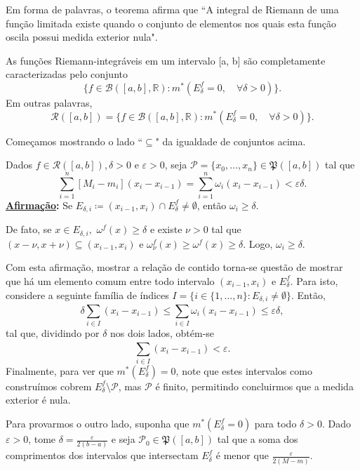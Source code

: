 \documentclass[../analysis_notes.tex]{subfiles}
\begin{document}
Em forma de palavras, o teorema afirma que ``A integral de Riemann de uma função limitada existe quando o conjunto de elementos nos quais esta função oscila possui medida exterior nula".
\begin{theorem*}
	As funções Riemann-integráveis em um intervalo [a, b] são completamente caracterizadas pelo conjunto
	\[
		\{f\in \mathcal{B}([a, b], \mathbb{R}): m^{*}(E_{\delta }^{f}=0,\quad \forall \delta >0)\}.
	\]
	Em outras palavras,
	\[
		\mathcal{R}([a, b])=\{f\in \mathcal{B}([a, b], \mathbb{R}): m^{*}(E_{\delta }^{f}=0,\quad \forall \delta >0)\}.
	\]
\end{theorem*}
\begin{proof*}
	Começamos mostrando o lado ``\(\subseteq \)" da igualdade de conjuntos acima.

	Dados \(f\in \mathcal{R}([a, b]), \delta > 0\) e \(\varepsilon >0\), seja \(\mathcal{P}=\{x_{0}, \dotsc , x_{n}\}\in \mathfrak{P}([a, b])\) tal que
	\[
		\sum\limits_{i=1}^{n}[M_{i}-m_{i}](x_{i}-x_{i-1})=\sum\limits_{i=1}^{n}\omega_{i}(x_{i}-x_{i-1})<\varepsilon\delta.
	\]
	\textbf{\underline{Afirmação}:} Se \(E_{\delta, i}\coloneqq (x_{i-1}, x_{i})\cap E_{\delta}^{f}\neq\emptyset\), então \(\omega_{i}\geq \delta \).

	De fato, se \(x\in E_{\delta , i},\) \(\omega^{f}(x)\geq \delta \) e existe \(\nu >0\) tal que \((x-\nu, x+\nu )\subseteq (x_{i-1}, x_{i})\) e \(\omega_{\nu }^{f}(x)\geq \omega^{f}(x)\geq \delta \). Logo, \(\omega_{i}\geq \delta \).

	Com esta afirmação, mostrar a relação de contido torna-se questão de mostrar que há um elemento comum entre todo intervalo \((x_{i-1}, x_{i})\) e \(E_{\delta }^{f}\). Para isto, considere a seguinte família de índices \(I=\{i\in \{1, \dotsc , n\}: E_{\delta, i}\neq\emptyset\}\). Então,
	\[
		\delta \sum\limits_{i\in I}^{}(x_{i}-x_{i-1})\leq \sum\limits_{i\in I}^{}\omega_{i}(x_{i}-x_{i-1})\leq \varepsilon\delta,
	\]
	tal que, dividindo por \(\delta \) nos dois lados, obtém-se
	\[
		\sum\limits_{i\in I}^{}(x_{i}-x_{i-1})< \varepsilon.
	\]
	Finalmente, para ver que \(m^{*}(E_{\delta }^{f})=0\), note que estes intervalos como construímos cobrem \(E_{\delta }^{f}\setminus{\mathcal{P}}\), mas \(\mathcal{P}\) é finito, permitindo concluirmos que a medida exterior é nula.

	Para provarmos o outro lado, suponha que \(m^{*}(E_{\delta }^{f}=0)\) para todo \(\delta > 0\). Dado \(\varepsilon >0\), tome \(\delta = \frac{\varepsilon }{2(b-a)}\) e seja \(\mathcal{P}_{0}\in \mathfrak{P}([a, b])\) tal que a soma dos comprimentos dos intervalos que intersectam \(E_{\delta }^{f}\) é menor que \(\frac{\varepsilon }{2(M-m)}\).


\end{proof*}
\end{document}

